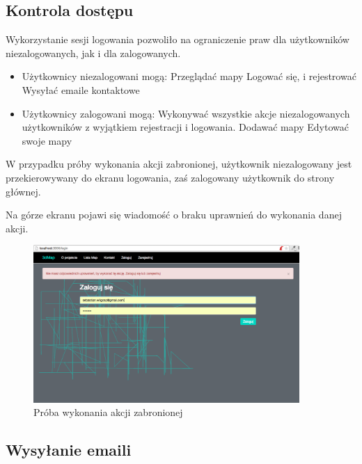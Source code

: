 \subsection{Kontrola dostępu}

Wykorzystanie sesji logowania pozwoliło na ograniczenie praw dla użytkowników niezalogowanych, jak i dla zalogowanych.

\begin{itemize}
\item Użytkownicy niezalogowani mogą:
	\subitem Przeglądać mapy
	\subitem Logować się, i rejestrować
	\subitem Wysyłać emaile kontaktowe
			
\item Użytkownicy zalogowani mogą:
	\subitem Wykonywać wszystkie akcje niezalogowanych użytkowników z wyjątkiem rejestracji i logowania.
	\subitem Dodawać mapy
	\subitem Edytować swoje mapy
\end{itemize}

W przypadku próby wykonania akcji zabronionej, użytkownik niezalogowany jest przekierowywany do ekranu logowania, zaś zalogowany użytkownik do strony głównej.

Na górze ekranu pojawi się wiadomość o braku uprawnień do wykonania danej akcji.

\FloatBarrier
 	\begin{figure}[ht]
        \centering
        \includegraphics[width=0.90\textwidth,height=0.46\textheight]{img/no_access.png}
	\caption{Próba wykonania akcji zabronionej}
        \label{rys:screen_no_access}
    \end{figure}
\FloatBarrier

\subsection{Wysyłanie emaili}

